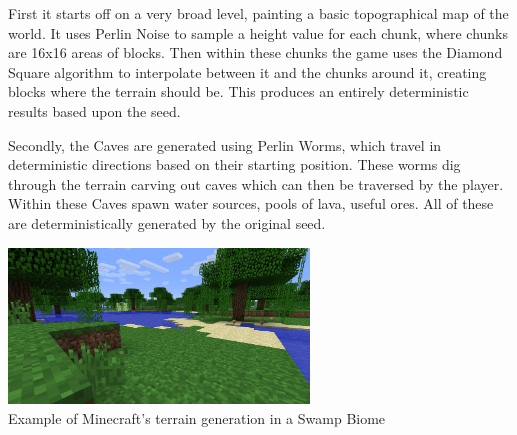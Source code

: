 \begin{flushleft}
\begin{enumerate}
\begin{enumerate}
\begin{enumerate}
                            \vspace{0.2cm}

                            First it starts off on a very broad level, painting a basic topographical map of the world. It uses Perlin Noise to sample
                            a height value for each chunk, where chunks are 16x16 areas of blocks. Then within these chunks the game uses the Diamond Square
                            algorithm to interpolate between it and the chunks around it, creating blocks where the terrain should be. This produces an 
                            entirely deterministic results based upon the seed.\\

                            \vspace{0.2cm}

                            Secondly, the Caves are generated using Perlin Worms, which travel in deterministic directions based on their starting position.
                            These worms dig through the terrain carving out caves which can then be traversed by the player. Within these Caves spawn water
                            sources, pools of lava, useful ores. All of these are deterministically generated by the original seed. \\ 

                            \vspace{0.2cm}
                            \begin{center}
                            \includegraphics[width=8cm]{Images/InitialResearch/MCTerrainGeneration.jpg} \\
                            Example of Minecraft's terrain generation in a Swamp Biome \\ 
                            \vspace{0.2cm}


\end{center}
\end{enumerate}
\end{enumerate}
\end{enumerate}
\end{flushleft}
